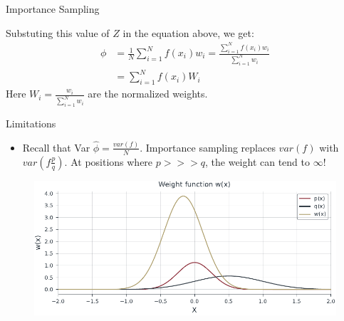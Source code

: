 \documentclass{beamer}
\begin{document}
\begin{section}{Importance Sampling}
    \begin{frame}
        Substuting this value of $Z$ in the equation above, we get:
        \begin{align*}
            \phi &= \frac{1}{N}\sum_{i=1}^N f(x_i)w_i = \frac{\sum_{i=1}^N f(x_i)w_i}{\sum_{i=1}^N w_i} \\
            &= \sum_{i=1}^N f(x_i)W_i
        \end{align*}
        Here $W_i = \frac{w_i}{\sum_{i=1}^N w_i}$ are the normalized weights.
    \end{frame}

    \begin{frame}{Limitations}
        \begin{itemize}
            \item Recall that Var $\hat{\phi} = \frac{var(f)}{N}$. Importance sampling replaces $var(f)$ with $var(f\frac{p}{q})$. At positions where $p>>>q$, the weight can tend to $\infty$!
        \end{itemize}
        \begin{figure}
                \centering
                \includegraphics[scale=0.8]{../figures/importance_sampling_weight_function.pdf}
        \end{figure}
    \end{frame}
\end{section}
\end{document}
